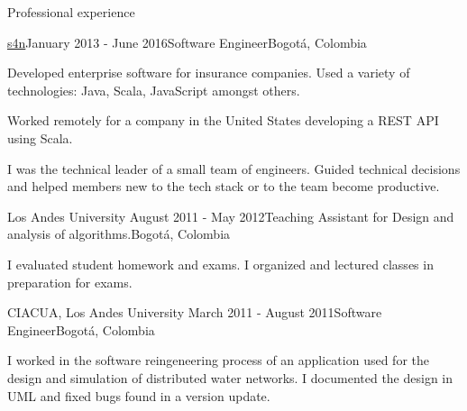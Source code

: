 \documentclass{resume} %
\def\uniandes{Los Andes University }
\begin{document}
\begin{rSection}{Professional experience}
\begin{rSubsection}{\href{https://www.s4n.co/}{s4n}}{January 2013 - June 2016}{Software Engineer}{Bogot\'a, Colombia}
\begin{rList}
\item Developed enterprise software for insurance companies. Used a variety of technologies: Java, Scala, JavaScript amongst others.
\item Worked remotely for a company in the United States developing a REST API using Scala.
\item I was the technical leader of a small team of engineers. Guided technical decisions and helped members new to the tech stack or to the team become productive.
\end{rList}
\end{rSubsection}


\begin{rSubsection}{\uniandes}{August 2011 - May 2012}{Teaching Assistant for Design and analysis of algorithms.}{Bogot\'a, Colombia}
\begin{rList}
\item I evaluated student homework and exams. I organized and lectured classes in preparation for exams.
\end{rList}
\end{rSubsection}


\begin{rSubsection}{CIACUA, \uniandes}{March 2011 - August 2011}{Software Engineer}{Bogot\'a, Colombia}
\begin{rList}
\item I worked in the software reingeneering process of an application used for the design and simulation of distributed water networks. I documented the design in UML and fixed bugs found in a version update.
\end{rList}
\end{rSubsection}

\end{rSection}
\end{document}
